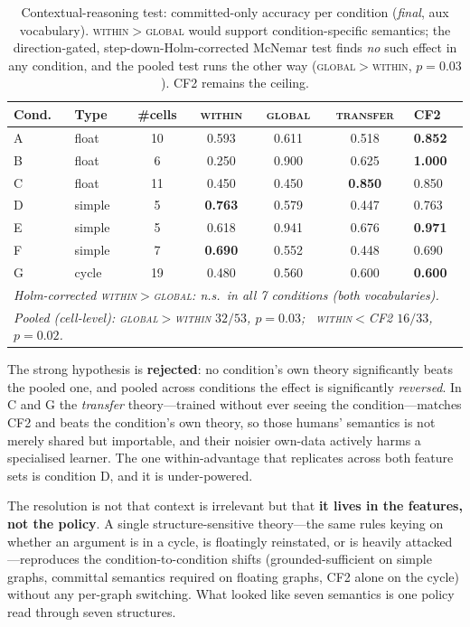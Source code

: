 \documentclass[11pt]{article}
\newcommand{\best}[1]{\textbf{#1}}
\begin{document}
\begin{table}[t]
\centering
\small
\caption{Contextual-reasoning test: committed-only accuracy per condition (\emph{final}, aux
vocabulary). \textsc{within}$>$\textsc{global} would support condition-specific semantics; the
direction-gated, step-down-Holm-corrected McNemar test finds \emph{no} such effect in any condition,
and the pooled test runs the other way (\textsc{global}$>$\textsc{within}, $p{=}0.03$). CF2 remains
the ceiling.}
\label{tab:act3}
\begin{tabular}{llccccl}
\toprule
Cond. & Type & \#cells & \textsc{within} & \textsc{global} & \textsc{transfer} & CF2\\
\midrule
A & float  & 10 & 0.593 & 0.611 & 0.518 & \best{0.852}\\
B & float  &  6 & 0.250 & 0.900 & 0.625 & \best{1.000}\\
C & float  & 11 & 0.450 & 0.450 & \best{0.850} & 0.850\\
D & simple &  5 & \best{0.763} & 0.579 & 0.447 & 0.763\\
E & simple &  5 & 0.618 & 0.941 & 0.676 & \best{0.971}\\
F & simple &  7 & \best{0.690} & 0.552 & 0.448 & 0.690\\
G & cycle  & 19 & 0.480 & 0.560 & 0.600 & \best{0.600}\\
\midrule
\multicolumn{7}{l}{\emph{Holm-corrected \textsc{within}$>$\textsc{global}: n.s.\ in all 7 conditions
(both vocabularies).}}\\
\multicolumn{7}{l}{\emph{Pooled (cell-level): \textsc{global}$>$\textsc{within} $32/53$, $p{=}0.03$;
\ \textsc{within}$<$CF2 $16/33$, $p{=}0.02$.}}\\
\bottomrule
\end{tabular}
\end{table}

The strong hypothesis is \textbf{rejected}: no condition's own theory significantly beats the pooled
one, and pooled across conditions the effect is significantly \emph{reversed}. In C and G the
\emph{transfer} theory---trained without ever seeing the condition---matches CF2 and beats the
condition's own theory, so those humans' semantics is not merely shared but importable, and their
noisier own-data actively harms a specialised learner. The one within-advantage that replicates
across both feature sets is condition D, and it is under-powered.

The resolution is not that context is irrelevant but that \textbf{it lives in the features, not the
policy}. A single structure-sensitive theory---the same rules keying on whether an argument is in a
cycle, is floatingly reinstated, or is heavily attacked---reproduces the condition-to-condition
shifts (grounded-sufficient on simple graphs, committal semantics required on floating graphs, CF2
alone on the cycle) without any per-graph switching. What looked like seven semantics is one policy
read through seven structures.
\end{document}
